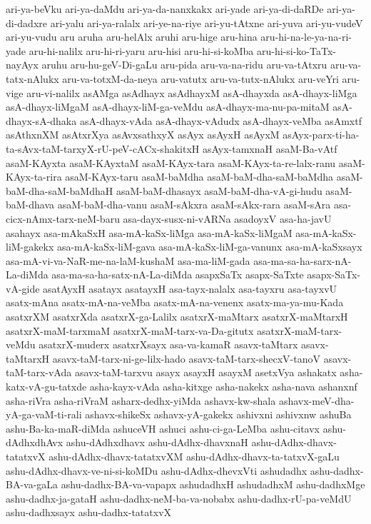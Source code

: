 {ari-ya-beVku
ari-ya-daMdu
ari-ya-da-nanxkakx
ari-yade
ari-ya-di-daRDe
ari-ya-di-dadxre
ari-yalu
ari-ya-ralalx
ari-ye-na-riye
ari-yu-tAtxne
ari-yuva
ari-yu-vudeV
ari-yu-vudu
aru
aruha
aru-helAlx
aruhi
aru-hige
aru-hina
aru-hi-na-le-ya-na-ri-yade
aru-hi-nalilx
aru-hi-ri-yaru
aru-hisi
aru-hi-si-koMba
aru-hi-si-ko-TaTx-nayAyx
aruhu
aru-hu-geV-Di-gaLu
aru-pida
aru-va-na-ridu
aru-va-tAtxru
aru-va-tatx-nAlukx
aru-va-totxM-da-neya
aru-vatutx
aru-va-tutx-nAlukx
aru-veYri
aru-vige
aru-vi-nalilx
asAMga
asAdhayx
asAdhayxM
asA-dhayxda
asA-dhayx-liMga
asA-dhayx-liMgaM
asA-dhayx-liM-ga-veMdu
asA-dhayx-ma-nu-pa-mitaM
asA-dhayx-sA-dhaka
asA-dhayx-vAda
asA-dhayx-vAdudx
asA-dhayx-veMba
asAmxtf
asAthxnXM
asAtxrXya
asAvxsathxyX
asAyx
asAyxH
asAyxM
asAyx-parx-ti-ha-ta-sAvx-taM-tarxyX-rU-peV-cACx-shakitxH
asAyx-tamxnaH
asaM-Ba-vAtf
asaM-KAyxta
asaM-KAyxtaM
asaM-KAyx-tara
asaM-KAyx-ta-re-lalx-ranu
asaM-KAyx-ta-rira
asaM-KAyx-taru
asaM-baMdha
asaM-baM-dha-saM-baMdha
asaM-baM-dha-saM-baMdhaH
asaM-baM-dhasayx
asaM-baM-dha-vA-gi-hudu
asaM-baM-dhava
asaM-baM-dha-vanu
asaM-sAkxra
asaM-sAkx-rara
asaM-sAra
asa-cicx-nAmx-tarx-neM-baru
asa-dayx-susx-ni-vARNa
asadoyxV
asa-ha-javU
asahayx
asa-mAkaSxH
asa-mA-kaSx-liMga
asa-mA-kaSx-liMgaM
asa-mA-kaSx-liM-gakekx
asa-mA-kaSx-liM-gava
asa-mA-kaSx-liM-ga-vanunx
asa-mA-kaSxsayx
asa-mA-vi-va-NaR-me-na-laM-kushaM
asa-ma-liM-gada
asa-ma-sa-ha-sarx-nA-La-diMda
asa-ma-sa-ha-satx-nA-La-diMda
asapxSaTx
asapx-SaTxte
asapx-SaTx-vA-gide
asatAyxH
asatayx
asatayxH
asa-tayx-nalalx
asa-tayxru
asa-tayxvU
asatx-mAna
asatx-mA-na-veMba
asatx-mA-na-venenx
asatx-ma-ya-mu-Kada
asatxrXM
asatxrXda
asatxrX-ga-Lalilx
asatxrX-maMtarx
asatxrX-maMtarxH
asatxrX-maM-tarxmaM
asatxrX-maM-tarx-va-Da-gitutx
asatxrX-maM-tarx-veMdu
asatxrX-muderx
asatxrXsayx
asa-va-kamaR
asavx-taMtarx
asavx-taMtarxH
asavx-taM-tarx-ni-ge-lilx-hado
asavx-taM-tarx-shecxV-tanoV
asavx-taM-tarx-vAda
asavx-taM-tarxvu
asayx
asayxH
asayxM
asetxVya
ashakatx
asha-katx-vA-gu-tatxde
asha-kayx-vAda
asha-kitxge
asha-nakekx
asha-nava
ashanxnf
asha-riVra
asha-riVraM
asharx-dedhx-yiMda
ashavx-kw-shala
ashavx-meV-dha-yA-ga-vaM-ti-rali
ashavx-shikeSx
ashavx-yA-gakekx
ashivxni
ashivxnw
ashuBa
ashu-Ba-ka-maR-diMda
ashuceVH
ashuci
ashu-ci-ga-LeMba
ashu-citavx
ashu-dAdhxdhAvx
ashu-dAdhxdhavx
ashu-dAdhx-dhavxnaH
ashu-dAdhx-dhavx-tatatxvX
ashu-dAdhx-dhavx-tatatxvXM
ashu-dAdhx-dhavx-ta-tatxvX-gaLu
ashu-dAdhx-dhavx-ve-ni-si-koMDu
ashu-dAdhx-dhevxVti
ashudadhx
ashu-dadhx-BA-va-gaLa
ashu-dadhx-BA-va-vapapx
ashudadhxH
ashudadhxM
ashu-dadhxMge
ashu-dadhx-ja-gataH
ashu-dadhx-neM-ba-va-nobabx
ashu-dadhx-rU-pa-veMdU
ashu-dadhxsayx
ashu-dadhx-tatatxvX
}
